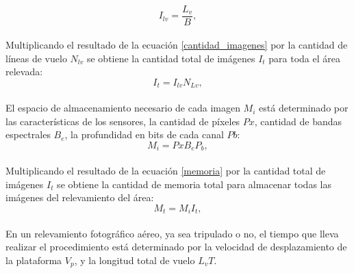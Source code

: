 \\
\begin{equation}
	I_{lv}=\frac{L_v}{B},\label{cantidad_imagenes}
\end{equation}
\\
Multiplicando el resultado de la ecuación \ref{cantidad_imagenes} por la cantidad de líneas de vuelo $N_{lv}$ se obtiene la cantidad total de imágenes $I_t$ para toda el área relevada:
\\
\begin{equation}
	I_t={I_{lv}}{N_{Lv}},\label{cantidad_total_imagenes}
\end{equation}
\\
El espacio de almacenamiento necesario de cada imagen $M_i$ está determinado por las características de los sensores, la cantidad de píxeles $Px$, cantidad de bandas espectrales $B_e$, la profundidad en bits de cada canal $Pb$:
\\
\begin{equation}
	M_i={Px}{B_e}{P_b},\label{memoria}
\end{equation}
\\
Multiplicando el resultado de la ecuación \ref{memoria} por la cantidad total de imágenes $I_t$ se obtiene la cantidad de memoria total para almacenar todas las imágenes del relevamiento del área:
\\
\begin{equation}
	M_t={M_i}{I_t},\label{memoria_total}
\end{equation}
\\
En un relevamiento fotográfico aéreo, ya sea tripulado o no, el tiempo que lleva realizar el procedimiento está determinado por la velocidad de desplazamiento de la plataforma $V_p$, y la longitud total de vuelo $L_vT$. 
